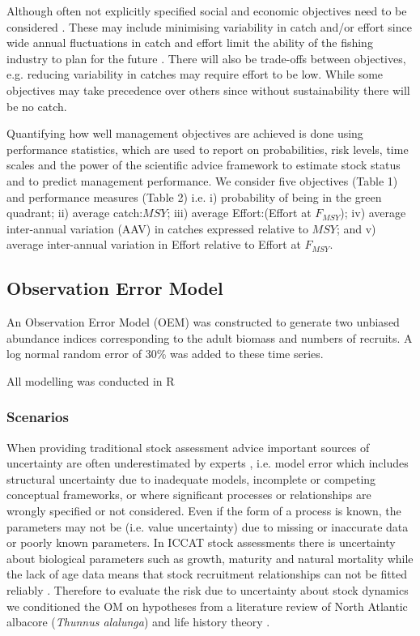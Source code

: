 \documentclass[%
nonumbib,      %
%
]{nrc1}                          %
\begin{document}
Although often not explicitly specified social and economic objectives need to be considered \citep{iccat2007swgsm}. These may include minimising variability in catch and/or effort since wide annual fluctuations in catch and effort limit the ability of the fishing industry to plan for the future \citep{kell2005flat, kell2005round}. There will also be trade-offs between objectives, e.g. reducing variability in catches may require effort to be low. While some objectives may take precedence over others since without sustainability there will be no catch. 

Quantifying how well management objectives are achieved is done using performance statistics, which are used to report on probabilities, risk levels, time scales and the power of the scientific advice framework to estimate stock status and to predict management performance. We consider five objectives (Table 1) and performance measures (Table 2) i.e. i) probability of being in the green quadrant; ii) average catch:$MSY$; iii) average Effort:(Effort at $F_{MSY}$); iv) average inter-annual variation (AAV) in catches expressed relative to $MSY$; and v) average inter-annual variation in Effort relative to Effort at $F_{MSY}$.


\subsection{Observation Error Model}

An Observation Error Model (OEM) was constructed to generate two unbiased abundance indices corresponding to the adult biomass and numbers of recruits.
A log normal random error of 30\% was added to these time series.

All modelling was conducted in R \cite{R}


\subsubsection*{Scenarios} 

When providing traditional stock assessment advice important sources of uncertainty are often underestimated by experts \citep{morgan1990uncertainty},  i.e. model error which includes structural uncertainty due to inadequate models, incomplete or competing conceptual frameworks, or where significant processes or relationships are wrongly specified or not considered. Even if the form of a process is known, the parameters may not be (i.e. value uncertainty) due to missing or inaccurate data or poorly known parameters. In ICCAT stock assessments there is uncertainty about biological parameters such as growth, maturity and natural mortality while the lack of age data means that stock recruitment relationships can not be fitted reliably \citep{leach2014elicit}. Therefore to evaluate the risk due to uncertainty about stock dynamics we conditioned the OM on hypotheses from a literature review of North Atlantic albacore (\textit{Thunnus alalunga}) \citep{santiago2005integrated, santiago2004dinamica} and life history theory \citep{gislason2010does}. 
\end{document}
